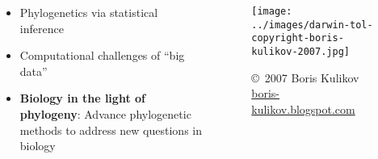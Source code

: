 \begin{frame}
    \begin{columns}[c]
        
        \begin{itemize}[<+->]
            \item Phylogenetics via statistical inference
            \item Computational challenges of ``big data''
            \item \textbf{Biology in the light of phylogeny}: Advance
                phylogenetic methods to address new questions in biology
        \end{itemize}
        

        \begin{figure}
            \begin{center}
            \texttt{[image: ../images/darwin-tol-copyright-boris-kulikov-2007.jpg]}
            \caption{\tiny \copyright~2007 Boris Kulikov \href{http://boris-kulikov.blogspot.com/}{boris-kulikov.blogspot.com}}
            \end{center}
        \end{figure}
    \end{columns}
\end{frame}

